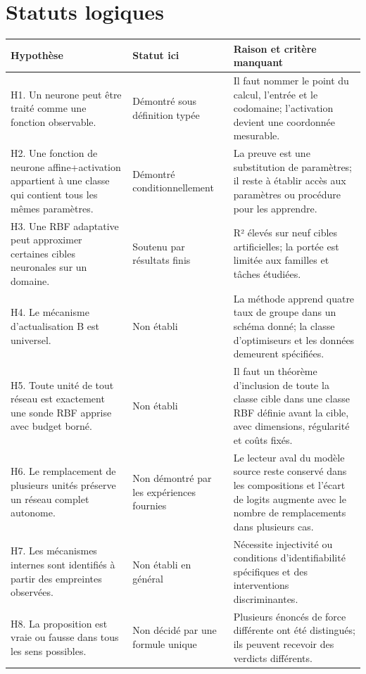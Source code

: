 \documentclass[11pt,a4paper,oneside]{report}
\begin{document}
\section{Statuts logiques}
\begin{longtable}{p{4.8cm}p{3.0cm}p{7.1cm}}
\toprule
\textbf{Hypothèse} & \textbf{Statut ici} & \textbf{Raison et critère manquant}\\
\midrule\endhead
H1. Un neurone peut être traité comme une fonction observable. & Démontré sous définition typée & Il faut nommer le point du calcul, l'entrée et le codomaine; l'activation devient une coordonnée mesurable.\\
H2. Une fonction de neurone affine+activation appartient à une classe qui contient tous les mêmes paramètres. & Démontré conditionnellement & La preuve est une substitution de paramètres; il reste à établir accès aux paramètres ou procédure pour les apprendre.\\
H3. Une RBF adaptative peut approximer certaines cibles neuronales sur un domaine. & Soutenu par résultats finis & R² élevés sur neuf cibles artificielles; la portée est limitée aux familles et tâches étudiées.\\
H4. Le mécanisme d'actualisation B est universel. & Non établi & La méthode apprend quatre taux de groupe dans un schéma donné; la classe d'optimiseurs et les données demeurent spécifiées.\\
H5. Toute unité de tout réseau est exactement une sonde RBF apprise avec budget borné. & Non établi & Il faut un théorème d'inclusion de toute la classe cible dans une classe RBF définie avant la cible, avec dimensions, régularité et coûts fixés.\\
H6. Le remplacement de plusieurs unités préserve un réseau complet autonome. & Non démontré par les expériences fournies & Le lecteur aval du modèle source reste conservé dans les compositions et l'écart de logits augmente avec le nombre de remplacements dans plusieurs cas.\\
H7. Les mécanismes internes sont identifiés à partir des empreintes observées. & Non établi en général & Nécessite injectivité ou conditions d'identifiabilité spécifiques et des interventions discriminantes.\\
H8. La proposition est vraie ou fausse dans tous les sens possibles. & Non décidé par une formule unique & Plusieurs énoncés de force différente ont été distingués; ils peuvent recevoir des verdicts différents.\\
\bottomrule
\end{longtable}
\end{document}
